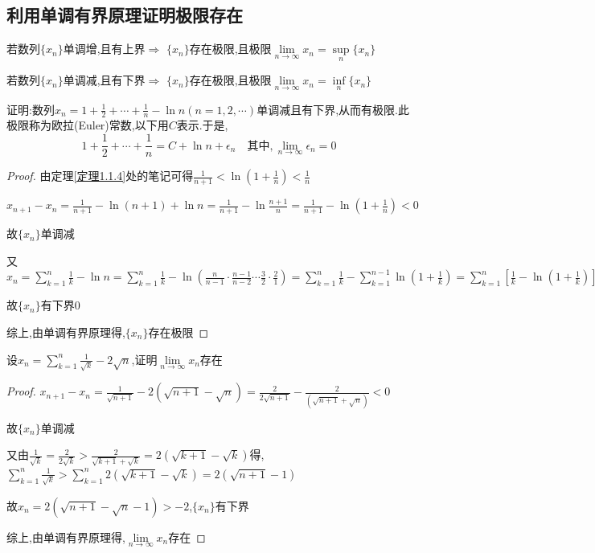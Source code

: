 \subsection{利用单调有界原理证明极限存在}

\begin{theorem}[单调有界原理]
    若数列$\{x_n\}$单调增,且有上界$\Longrightarrow$ $\{x_n\}$存在极限,且极限$\lim \limits_{n \to \infty} x_n = \underset{n}{\sup} \{x_n\}$

    若数列$\{x_n\}$单调减,且有下界$\Longrightarrow$ $\{x_n\}$存在极限,且极限$\lim \limits_{n \to \infty} x_n = \underset{n}{\inf} \{x_n\}$
\end{theorem}

\begin{example}
    证明:数列$x_n=1+\frac{1}{2}+\cdots+\frac{1}{n}-\ln n(n=1,2,\cdots)$单调减且有下界,从而有极限.此极限称为欧拉(Euler)常数,以下用$C$表示.于是,
    $$1+\frac{1}{2}+\cdots+\frac{1}{n} = C + \ln n +\epsilon_n \quad \mbox{其中}, \lim \limits_{n \to \infty} \epsilon_n = 0$$
\end{example}

\begin{proof}

    由定理\ref{定理1.1.4}处的笔记可得$\frac{1}{n+1}<\ln(1+\frac{1}{n})<\frac{1}{n}$

    $x_{n+1}-x_n=\frac{1}{n+1}-\ln (n+1)+\ln n
    =\frac{1}{n+1}-\ln \frac{n+1}{n}
    =\frac{1}{n+1}-\ln (1+\frac{1}{n})<0$

    故$\{x_n\}$单调减 

    又$x_n=\sum\limits_{k=1}^{n} \frac{1}{k}-\ln n
    =\sum\limits_{k=1}^{n} \frac{1}{k}-\ln  (\frac{n}{n-1} \cdot \frac{n-1}{n-2} \cdots \frac{3}{2} \cdot \frac{2}{1})
    =\sum\limits_{k=1}^{n} \frac{1}{k}-\sum\limits_{k=1}^{n-1}\ln (1+\frac{1}{k})
    =\sum\limits_{k=1}^{n} [\frac{1}{k}-\ln (1+\frac{1}{k})]+\frac{1}{n}>\frac{1}{n}>0$

    故$\{x_n\}$有下界0

    综上,由单调有界原理得,$\{x_n\}$存在极限
\end{proof}

\begin{example}
    设$x_n=\sum\limits_{k=1}^{n} \frac{1}{\sqrt{k}}-2\sqrt{n}$,证明$\lim \limits_{n \to \infty} x_n$存在
\end{example}

\begin{proof}

    $x_{n+1}-x_n
    =\frac{1}{\sqrt{n+1}}-2(\sqrt{n+1}-\sqrt{n})
    =\frac{2}{2\sqrt{n+1}}-\frac{2}{(\sqrt{n+1}+\sqrt{n})}<0$

    故$\{x_n\}$单调减

    又由$\frac{1}{\sqrt{k}}=\frac{2}{2\sqrt{k}}>\frac{2}{\sqrt{k+1}+\sqrt{k}}=2(\sqrt{k+1}-\sqrt{k})$得,$\sum\limits_{k=1}^{n} \frac{1}{\sqrt{k}}>\sum\limits_{k=1}^{n} 2(\sqrt{k+1}-\sqrt{k})=2(\sqrt{n+1}-1)$

    故$x_n=2(\sqrt{n+1}-\sqrt{n}-1)>-2$,\quad$\{x_n\}$有下界 

    综上,由单调有界原理得,$\lim \limits_{n \to \infty} x_n$存在
\end{proof}



